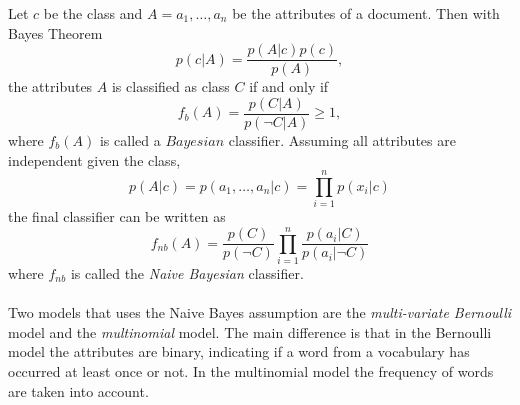 Let $c$ be the class and $A = a_1, \dots ,a_n$ be the attributes of a document. Then with Bayes Theorem
\begin{equation}
p(c|A)=\frac{p(A|c)p(c)}{p(A)},
\end{equation}
the attributes $A$ is classified as class $C$ if and only if
\begin{equation}
f_b(A)=\frac{p(C|A)}{p(\neg C|A)} \geq 1,
\end{equation}
where $f_b(A)$ is called a $Bayesian$ classifier. Assuming all attributes are independent given the class, 
\[
p(A|c)=p(a_1,\dots ,a_n | c) = \prod_{i=1}^n p(x_i|c)
\]
the final classifier can be written as
\begin{equation}
f_{nb}(A) = \frac{p(C)}{p(\neg C)}\prod_{i=1}^n\frac{p(a_i|C)}{p(a_i|\neg C)}
\end{equation}
where $f_{nb}$ is called the \emph{Naive Bayesian} classifier.\\\\
Two models that uses the Naive Bayes assumption are the \emph{multi-variate Bernoulli} model and the \emph{multinomial} model. The main difference is that in the Bernoulli model the attributes are binary, indicating if a word from a vocabulary has occurred at least once or not. In the multinomial model the frequency of words are taken into account.